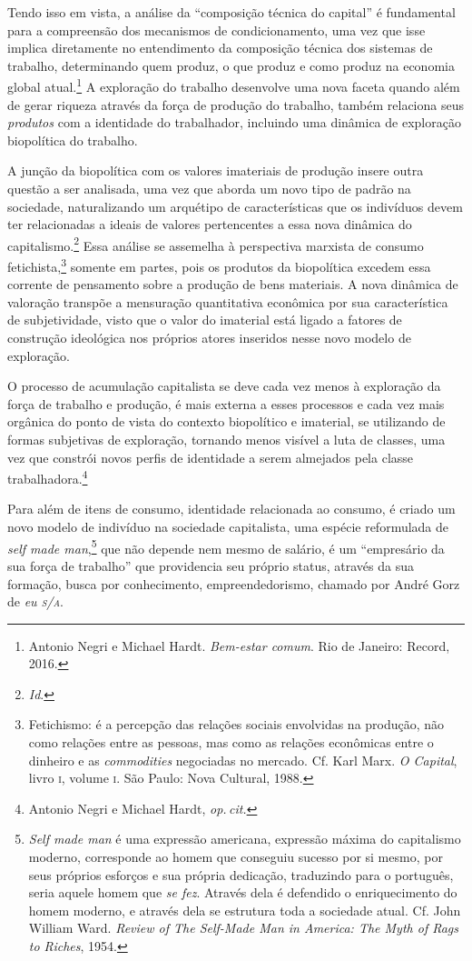 Tendo isso em vista, a análise da ``composição técnica do capital'' é
fundamental para a compreensão dos mecanismos de condicionamento, uma
vez que isse implica diretamente no entendimento da composição técnica
dos sistemas de trabalho, determinando quem produz, o que produz e como
produz na economia global atual.\footnote{Antonio Negri e Michael Hardt. \textit{Bem-estar comum}. Rio de Janeiro: Record, 2016.} A exploração do
trabalho desenvolve uma nova faceta quando além de gerar riqueza através
da força de produção do trabalho, também relaciona seus \textit{produtos} com
a identidade do trabalhador, incluindo uma dinâmica de exploração
biopolítica do trabalho.

A junção da biopolítica com os valores imateriais de produção insere
outra questão a ser analisada, uma vez que aborda um novo tipo de padrão
na sociedade, naturalizando um arquétipo de características que os
indivíduos devem ter relacionadas a ideais de valores pertencentes a
essa nova dinâmica do capitalismo.\footnote{\textit{Id}.} Essa análise
se assemelha à perspectiva marxista de consumo fetichista,\footnote{Fetichismo:
  é a percepção das relações sociais envolvidas na produção, não como
  relações entre as pessoas, mas como as relações econômicas entre o
  dinheiro e as \textit{commodities} negociadas no mercado. Cf. Karl Marx. \textit{O Capital}, livro \textsc{i}, volume \textsc{i}. São Paulo: Nova Cultural, 1988.}
somente em partes, pois os produtos da biopolítica excedem essa corrente
de pensamento sobre a produção de bens materiais. A nova dinâmica de
valoração transpõe a mensuração quantitativa econômica por sua
característica de subjetividade, visto que o valor do imaterial está
ligado a fatores de construção ideológica nos próprios atores inseridos
nesse novo modelo de exploração.

O processo de acumulação capitalista se deve cada vez menos à exploração
da força de trabalho e produção, é mais externa a esses processos e cada
vez mais orgânica do ponto de vista do contexto biopolítico e imaterial,
se utilizando de formas subjetivas de exploração, tornando menos visível
a luta de classes, uma vez que constrói novos perfis de identidade a
serem almejados pela classe trabalhadora.\footnote{Antonio Negri e Michael Hardt, \textit{op.\,cit.}}

Para além de itens de consumo, identidade relacionada ao consumo, é
criado um novo modelo de indivíduo na sociedade capitalista, uma espécie
reformulada de \textit{self made man},\footnote{\textit{Self made man} é uma
  expressão americana, expressão máxima do
  capitalismo moderno, corresponde ao homem que conseguiu sucesso por si
  mesmo, por seus próprios esforços e sua própria dedicação, traduzindo
  para o português, seria aquele homem que \textit{se fez}. Através dela é
  defendido o enriquecimento do homem moderno, e através dela se
  estrutura toda a sociedade atual. Cf. John William Ward. \textit{Review of The Self-Made Man in America: The Myth of Rags to Riches}, 1954.} que não
depende nem mesmo de salário, é um ``empresário da sua força de
trabalho'' que providencia seu próprio status, através da sua formação,
busca por conhecimento, empreendedorismo, chamado por André Gorz de \textit{eu
\textsc{s}/\textsc{a}}.


